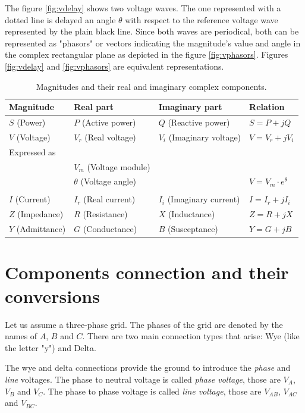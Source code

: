 \documentclass[nols,a4paper,twoside,notoc,fleqn]{tufte-book}
\begin{document}
The figure \ref{fig:vdelay} shows two voltage waves. The one represented with a dotted line is delayed an angle $\theta$ with respect to the reference voltage wave represented by the plain black line. Since both waves are periodical, both can be represented as "phasors" or vectors indicating the magnitude's value and angle in the complex rectangular plane as depicted in the figure \ref{fig:vphasors}. Figures \ref{fig:vdelay} and \ref{fig:vphasors} are equivalent representations.


\begin{table}[h]
\begin{center}
\footnotesize
\begin{tabular}{llll}
\toprule
Magnitude & Real part & Imaginary part & Relation\\
\midrule
$S$ (Power) & $P$ (Active power) & $Q$ (Reactive power) & $S=P +jQ$\\
$V$ (Voltage) & $V_r$ (Real voltage) & $V_i$ (Imaginary voltage) & $V=V_r +jV_i$\\
Expressed as  &  &  & \\
 & $V_m$ (Voltage module) &  & \\
 & $\theta$ (Voltage angle) &  & $V = V_m \cdot e^\theta$\\
  &  &  & \\
$I$ (Current) & $I_r$ (Real current) & $I_i$ (Imaginary current) & $I=I_r +jI_i$\\
$Z$ (Impedance) & $R$ (Resistance) & $X$ (Inductance) & $Z=R +jX$\\
$Y$ (Admittance) & $G$ (Conductance) & $B$ (Susceptance) & $Y=G +jB$\\
\bottomrule
\end{tabular}
\end{center}
  \caption{Magnitudes and their real and imaginary complex components.}
  \label{real_imaginary_table}
\end{table}






\section{Components connection and their conversions}

Let us assume a three-phase grid. The phases of the grid are denoted by the names of $A$, $B$ and $C$. There are two main connection types that arise: Wye (like the letter "y") and Delta.

The wye and delta connections provide the ground to introduce the \textit{phase} and \textit{line} voltages. The phase to neutral voltage is called \textit{phase voltage}, those are $V_A$, $V_B$ and $V_C$. The phase to phase voltage is called \textit{line voltage}, those are $V_{AB}$, $V_{AC}$ and $V_{BC}$.
\end{document}
